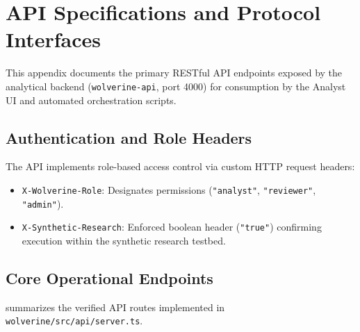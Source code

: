 \chapter{API Specifications and Protocol Interfaces}
\label{app:api-specifications}

This appendix documents the primary RESTful API endpoints exposed by the analytical backend (\texttt{wolverine-api}, port 4000) for consumption by the Analyst UI and automated orchestration scripts.

\section{Authentication and Role Headers}
The API implements role-based access control via custom HTTP request headers:
\begin{itemize}
    \item \texttt{X-Wolverine-Role}: Designates permissions (\texttt{"analyst"}, \texttt{"reviewer"}, \texttt{"admin"}).
    \item \texttt{X-Synthetic-Research}: Enforced boolean header (\texttt{"true"}) confirming execution within the synthetic research testbed.
\end{itemize}

\section{Core Operational Endpoints}
 summarizes the verified API routes implemented in \texttt{wolverine/src/api/server.ts}.

